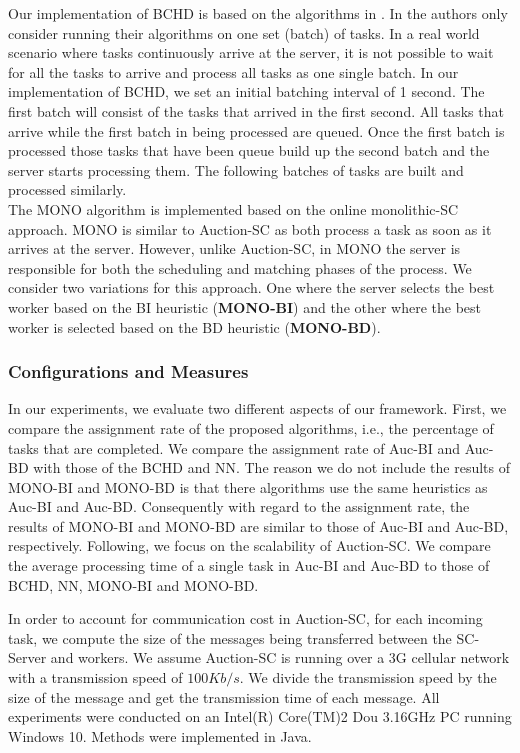 Our implementation of BCHD is based on the algorithms in \cite{Deng15}. In \cite{Deng15} the authors only consider running their algorithms on one set (batch) of tasks. In a real world scenario where tasks continuously arrive at the server, it is not possible to wait for all the tasks to arrive and process all tasks as one single batch. In our implementation of BCHD, we set an initial batching interval of 1 second. The first batch will consist of the tasks that arrived in the first second. All tasks that arrive while the first batch in being processed are queued. Once the first batch is processed those tasks that have been queue build up the second batch and the server starts processing them. The following batches of tasks are built and processed similarly.\\

The MONO algorithm is implemented based on the online monolithic-SC approach. MONO is similar to Auction-SC as both process a task as soon as it arrives at the server. However, unlike Auction-SC, in MONO the server is responsible for both the scheduling and matching phases of the process. We consider two variations for this approach. One where the server selects the best worker based on the BI heuristic (\textbf{MONO-BI}) and the other where the best worker is selected based on the BD heuristic (\textbf{MONO-BD}).\\

\subsubsection{Configurations and Measures}
In our experiments, we evaluate two different aspects of our framework. First, we compare the assignment rate of the proposed algorithms, i.e., the percentage of tasks that are completed. We compare the assignment rate of Auc-BI and Auc-BD with those of the BCHD and NN. The reason we do not include the results of MONO-BI and MONO-BD is that there algorithms use the same heuristics as Auc-BI and Auc-BD. Consequently with regard to the assignment rate, the results of MONO-BI and MONO-BD are similar to those of Auc-BI and Auc-BD, respectively. Following, we focus on the scalability of Auction-SC. We compare the average processing time of a single task in Auc-BI and Auc-BD to those of BCHD, NN, MONO-BI and MONO-BD.

In order to account for communication cost in Auction-SC, for each incoming task, we compute the size of the messages being transferred between the SC-Server and workers. We assume Auction-SC is running over a 3G cellular network with a transmission speed of $100 Kb/s$. We divide the transmission speed by the size of the message and get the transmission time of each message. All experiments were conducted on an Intel(R) Core(TM)2 Dou 3.16GHz PC running Windows 10. Methods were implemented in Java.\\

